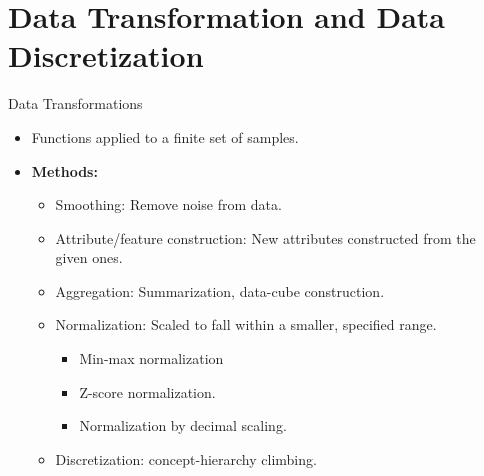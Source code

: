 \section{Data Transformation and Data Discretization}

\begin{frame}{Data Transformations}
	\begin{itemize}
		\item Functions applied to a finite set of samples.
		\item \textbf{Methods:}
		      \begin{itemize}
			      \item Smoothing: Remove noise from data.
			      \item Attribute/feature construction: New attributes constructed
			            from the given ones.
			      \item Aggregation: Summarization, data-cube construction.
			      \item Normalization: Scaled to fall within a smaller, specified
			            range.
			            \begin{itemize}
				            \item Min-max normalization
				            \item Z-score normalization.
				            \item Normalization by decimal scaling.
			            \end{itemize}
			      \item Discretization: concept-hierarchy climbing.
		      \end{itemize}
	\end{itemize}
\end{frame}

